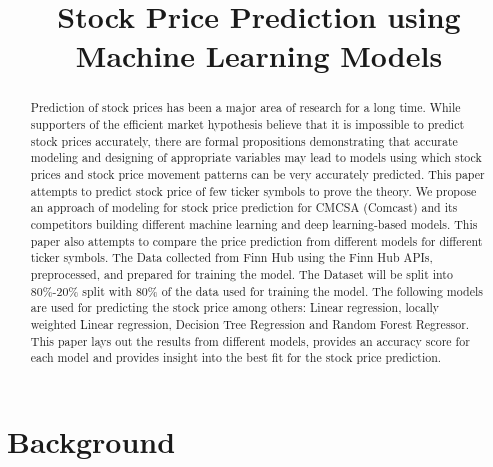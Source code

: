 \documentclass[conference]{IEEEtran}
\begin{document}
\title{Stock Price Prediction using Machine Learning Models }

\author{
}

\maketitle

\begin{abstract}
Prediction of stock prices has been a major area of research for a long time.
While supporters of the efficient market hypothesis believe that it is impossible to predict stock prices accurately, there are formal propositions demonstrating that accurate modeling and designing of appropriate variables may lead to models using which stock prices and stock price movement patterns can be very accurately predicted.
This paper attempts to predict stock price of few ticker symbols to prove the theory.
We propose an approach of modeling for stock price prediction for CMCSA (Comcast) and its competitors building different machine learning and deep learning-based models.
This paper also attempts to compare the price prediction from different models for different ticker symbols.
The Data collected from Finn Hub using the Finn Hub APIs, preprocessed, and prepared for training the model.
The Dataset will be split into 80\%-20\% split with 80\% of the data used for training the model.
The following models are used for predicting the stock price among others: Linear regression, locally weighted Linear regression, Decision Tree Regression and Random Forest Regressor.
This paper lays out the results from different models, provides an accuracy score for each model and provides insight into the best fit for the stock price prediction.
\end{abstract}

\section{Background}
\end{document}
